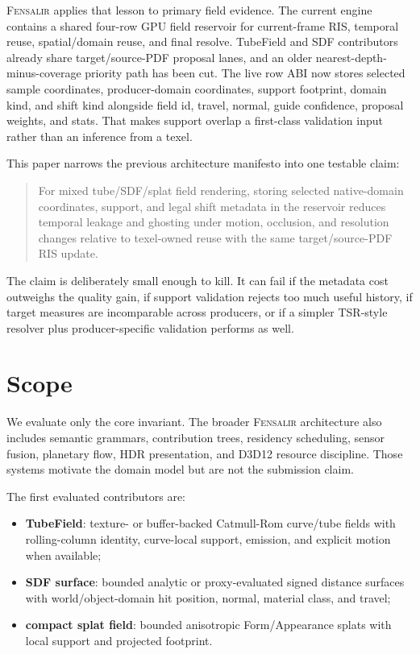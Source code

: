 \documentclass[11pt]{article}
\newcommand{\Fensalir}{\textsc{Fensalir}}
\newcommand{\TSR}{TSR}
\begin{document}
\Fensalir{} applies that lesson to primary field evidence.  The current engine
contains a shared four-row GPU field reservoir for current-frame RIS, temporal
reuse, spatial/domain reuse, and final resolve.  TubeField and SDF contributors
already share target/source-PDF proposal lanes, and an older
nearest-depth-minus-coverage priority path has been cut.  The live row ABI now
stores selected sample coordinates, producer-domain coordinates, support
footprint, domain kind, and shift kind alongside field id, travel, normal,
guide confidence, proposal weights, and stats.  That makes support overlap a
first-class validation input rather than an inference from a texel.

This paper narrows the previous architecture manifesto into one testable claim:

\begin{quote}
For mixed tube/SDF/splat field rendering, storing selected native-domain
coordinates, support, and legal shift metadata in the reservoir reduces
temporal leakage and ghosting under motion, occlusion, and resolution changes
relative to texel-owned reuse with the same target/source-PDF RIS update.
\end{quote}

The claim is deliberately small enough to kill.  It can fail if the metadata
cost outweighs the quality gain, if support validation rejects too much useful
history, if target measures are incomparable across producers, or if a simpler
\TSR-style resolver plus producer-specific validation performs as well.

\section{Scope}

We evaluate only the core invariant.  The broader \Fensalir{} architecture also
includes semantic grammars, contribution trees, residency scheduling, sensor
fusion, planetary flow, HDR presentation, and D3D12 resource discipline.  Those
systems motivate the domain model but are not the submission claim.

The first evaluated contributors are:

\begin{itemize}[leftmargin=1.5em]
  \item \textbf{TubeField}: texture- or buffer-backed Catmull-Rom curve/tube
  fields with rolling-column identity, curve-local support, emission, and
  explicit motion when available;
  \item \textbf{SDF surface}: bounded analytic or proxy-evaluated signed
  distance surfaces with world/object-domain hit position, normal, material
  class, and travel;
  \item \textbf{compact splat field}: bounded anisotropic Form/Appearance
  splats with local support and projected footprint.
\end{itemize}
\end{document}
